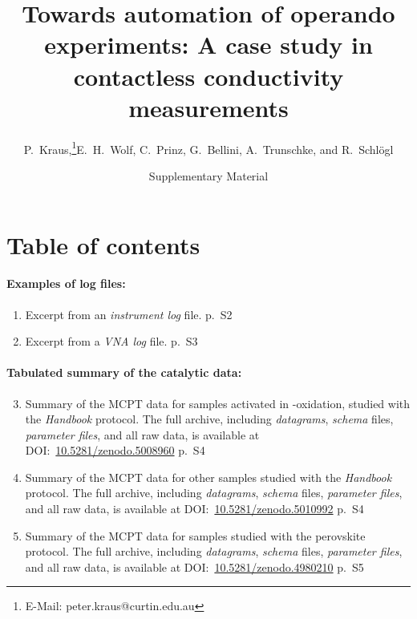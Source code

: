 \documentclass[12pt]{article}
\newcommand{\beginsupplement}{%
        \setcounter{table}{0}
        \renewcommand{\thetable}{S\arabic{table}}%
        \setcounter{figure}{0}
        \renewcommand{\thefigure}{S\arabic{figure}}%
        \renewcommand{\thepage}{S\arabic{page}}%
     }
\begin{document}
\title{Towards automation of operando experiments: A case study in contactless conductivity measurements}

\date{Supplementary Material}

\author{P.~Kraus,\thanks{E-Mail: peter.kraus@curtin.edu.au}\hspace{7pt}E.~H.~Wolf,
        C.~Prinz, G.~Bellini, A.~Trunschke, and R.~Schl\"{o}gl}

\maketitle




\beginsupplement

\section*{Table of contents}
\paragraph{Examples of log files:}
\begin{enumerate}
	\item Excerpt from an \emph{instrument log} file. \hfill p.~S2
    \item Excerpt from a \emph{VNA log} file. \hfill p.~S3
\end{enumerate}

\paragraph{Tabulated summary of the catalytic data:}
\begin{enumerate}
    \setcounter{enumi}{2}
	\item Summary of the MCPT data for samples activated in -oxidation, studied with the \emph{Handbook} protocol. The full archive, including \emph{datagrams}, \emph{schema} files, \emph{parameter files}, and all raw data, is available at DOI:~\href{https://doi.org/10.5281/zenodo.5008960}{10.5281/zenodo.5008960}  \hfill p.~S4
    \item Summary of the MCPT data for other samples studied with the \emph{Handbook} protocol. The full archive, including \emph{datagrams}, \emph{schema} files, \emph{parameter files}, and all raw data, is available at DOI:~\href{https://doi.org/10.5281/zenodo.5010992}{10.5281/zenodo.5010992}  \hfill p.~S4
    \item Summary of the MCPT data for samples studied with the perovskite protocol. The full archive, including \emph{datagrams}, \emph{schema} files, \emph{parameter files}, and all raw data, is available at DOI:~\href{https://doi.org/10.5281/zenodo.4980210}{10.5281/zenodo.4980210} \hfill p.~S5
\end{enumerate}
\end{document}
